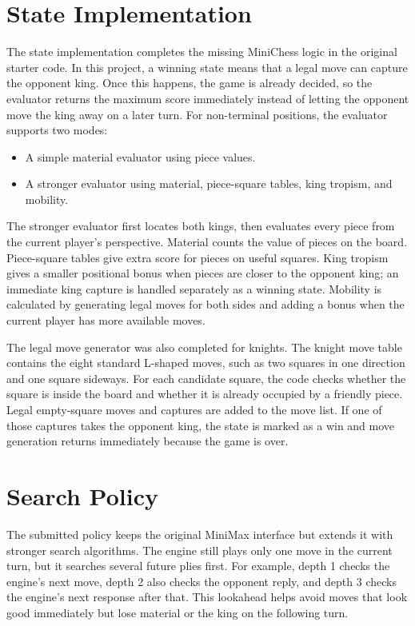 \documentclass[11pt,a4paper]{article}
\begin{document}
\section{State Implementation}

The state implementation completes the missing MiniChess logic in the original
starter code. In this project, a winning state means that a legal move can
capture the opponent king. Once this happens, the game is already decided, so
the evaluator returns the maximum score immediately instead of letting the
opponent move the king away on a later turn.
For non-terminal positions, the evaluator supports two modes:

\begin{itemize}[leftmargin=*]
    \item A simple material evaluator using piece values.
    \item A stronger evaluator using material, piece-square tables, king
    tropism, and mobility.
\end{itemize}

The stronger evaluator first locates both kings, then evaluates every piece from
the current player's perspective. Material counts the value of pieces on the
board. Piece-square tables give extra score for pieces on useful squares.
King tropism gives a smaller positional bonus when pieces are closer to the
opponent king; an immediate king capture is handled separately as a winning
state. Mobility is calculated by generating legal moves for both sides and
adding a bonus when the current player has more available moves.

The legal move generator was also completed for knights. The knight move table
contains the eight standard L-shaped moves, such as two squares in one
direction and one square sideways. For each candidate square, the code checks
whether the square is inside the board and whether it is already occupied by a
friendly piece. Legal empty-square moves and captures are added to the move
list. If one of those captures takes the opponent king, the state is marked as
a win and move generation returns immediately because the game is over.

\section{Search Policy}

The submitted policy keeps the original MiniMax interface but extends it with
stronger search algorithms. The engine still plays only one move in the current
turn, but it searches several future plies first. For example, depth 1 checks
the engine's next move, depth 2 also checks the opponent reply, and depth 3
checks the engine's next response after that. This lookahead helps avoid moves
that look good immediately but lose material or the king on the following turn.
\end{document}
